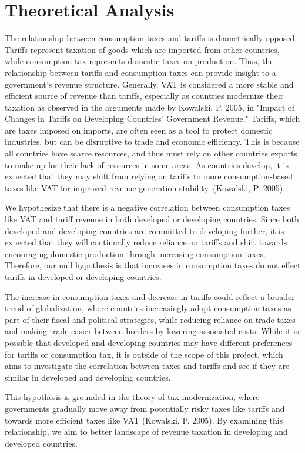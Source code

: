 \documentclass[12pt]{article}
\begin{document}
\section{Theoretical Analysis}
\label{sec:theory}
The relationship between consumption taxes and tariffs is diametrically opposed. Tariffs represent taxation of goods which are imported from other countries, while consumption tax represents domestic taxes on production. Thus, the relationship between tariffs and consumption taxes can provide insight to a government's revenue structure. Generally, VAT is considered a more stable and efficient source of revenue than tariffs, especially as countries modernize their taxation as observed in the arguments made by Kowalski, P. 2005, in "Impact of Changes in Tariffs on Developing Countries’ Government Revenue." Tariffs, which are taxes imposed on imports, are often seen as a tool to protect domestic industries, but can be disruptive to trade and economic efficiency. This is because all countries have scarce resources, and thus must rely on other countries exports to make up for their lack of resources in some areas. As countries develop, it is expected that they may shift from relying on tariffs to more consumption-based taxes like VAT for improved revenue generation stability. (Kowalski, P. 2005).

We hypothesize that there is a negative correlation between consumption taxes like VAT and tariff revenue in both developed or developing countries. Since both developed and developing countries are committed to developing further, it is expected that they will continually reduce reliance on tariffs and shift towards encouraging domestic production through increasing consumption taxes. Therefore, our null hypothesis is that increases in consumption taxes do not effect tariffs in developed or developing countries. 

The increase in consumption taxes and decrease in tariffs could reflect a broader trend of globalization, where countries increasingly adopt consumption taxes as part of their fiscal and political strategies, while reducing reliance on trade taxes and making trade easier between borders by lowering associated costs. While it is possible that developed and developing countries may have different preferences for tariffs or consumption tax, it is outside of the scope of this project, which aims to investigate the correlation between taxes and tariffs and see if they are similar in developed and developing countries.

This hypothesis is grounded in the theory of tax modernization, where governments gradually move away from potentially risky taxes like tariffs and towards more efficient taxes like VAT (Kowalski, P. 2005). By examining this relationship, we aim to better landscape of revenue taxation in developing and developed countries.
\end{document}
